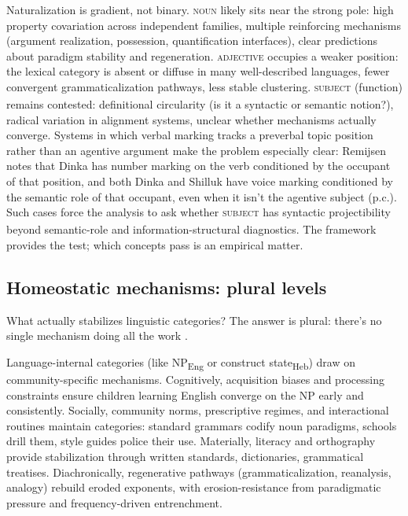 \documentclass[12pt]{article}
\begin{document}
Naturalization is gradient, not binary. \textsc{noun} likely sits near the strong pole: high property covariation across independent families, multiple reinforcing mechanisms (argument realization, possession, quantification interfaces), clear predictions about paradigm stability and regeneration. \textsc{adjective} occupies a weaker position: the lexical category is absent or diffuse in many well-described languages, fewer convergent grammaticalization pathways, less stable clustering. \textsc{subject}\textsubscript{\Cross} (function) remains contested: definitional circularity (is it a syntactic or semantic notion?), radical variation in alignment systems, unclear whether mechanisms actually converge. Systems in which verbal marking tracks a preverbal topic position rather than an agentive argument make the problem especially clear: Remijsen notes that Dinka has number marking on the verb conditioned by the occupant of that position, and both Dinka and Shilluk have voice marking conditioned by the semantic role of that occupant, even when it isn't the agentive subject (p.c.). Such cases force the analysis to ask whether \textsc{subject}\textsubscript{\Cross} has syntactic projectibility beyond semantic-role and information-structural diagnostics. The framework provides the test; which concepts pass is an empirical matter.

\subsection{Homeostatic mechanisms: plural levels}\label{subsec:mechanisms}
What actually stabilizes linguistic categories? The answer is plural: there's no single mechanism doing all the work \parencite[cf.][]{miller2021}.

Language-internal categories (like NP\textsubscript{Eng} or construct state\textsubscript{Heb}) draw on community-specific mechanisms. Cognitively, acquisition biases and processing constraints ensure children learning English converge on the NP early and consistently. Socially, community norms, prescriptive regimes, and interactional routines maintain categories: standard grammars codify noun paradigms, schools drill them, style guides police their use. Materially, literacy and orthography provide stabilization through written standards, dictionaries, grammatical treatises. Diachronically, regenerative pathways (grammaticalization, reanalysis, analogy) rebuild eroded exponents, with erosion-resistance from paradigmatic pressure and frequency-driven entrenchment.
\end{document}

